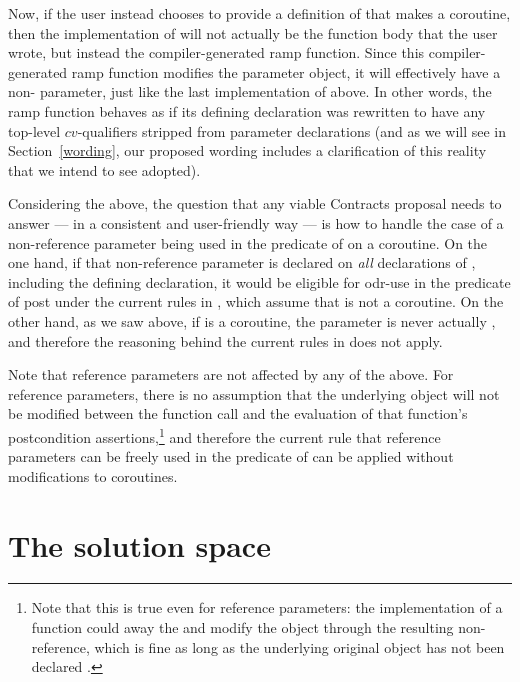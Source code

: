 Now, if the user instead chooses to provide a definition of  that makes  a coroutine, then the implementation of  will not actually be the function body that the user wrote, but instead the compiler-generated ramp function. Since this compiler-generated ramp function modifies the parameter object, it will effectively have a non-  parameter, just like the last implementation of  above. In other words, the ramp function behaves as if its defining declaration was rewritten to have any top-level $cv$-qualifiers stripped from parameter declarations (and as we will see in Section~\ref{wording}, our proposed wording includes a clarification of this reality that we intend to see adopted).

Considering the above, the question that any viable Contracts proposal needs to answer --- in a consistent and user-friendly way --- is how to handle the case of a non-reference parameter being used in the predicate of  on a coroutine. On the one hand, if that non-reference parameter is declared  on \emph{all} declarations of , including the defining declaration, it would be eligible for odr-use in the predicate of post under the current rules in \cite{P2900R8}, which assume that  is not a coroutine. On the other hand, as we saw above, if  is a coroutine, the parameter is never actually , and therefore the reasoning behind the current rules in \cite{P2900R8} does not apply.

Note that reference parameters are not affected by any of the above. For reference parameters, there is no assumption that the underlying object will not be modified between the function call and the evaluation of that function's postcondition assertions,\footnote{Note that this is true even for  reference parameters: the implementation of a function could  away the  and modify the object through the resulting non- reference, which is fine as long as the underlying original object has not been declared .} and therefore the current rule that reference parameters can be freely used in the predicate of  can be applied without modifications to coroutines.

\section{The solution space}
\label{solutions}

